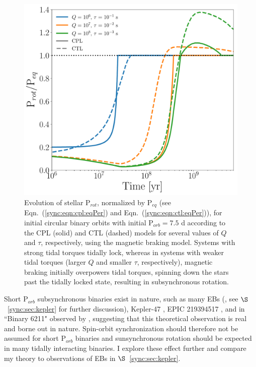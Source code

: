 \begin{figure}
	\includegraphics[width=\columnwidth]{eqPerShortPorbMatt.pdf}
   \caption{Evolution of stellar P$_{rot}$, normalized by P$_{eq}$ (see Eqn.~(\ref{sync:eqn:cpl:eqPer}) and Eqn.~(\ref{sync:eqn:ctl:eqPer})), for initial circular binary orbits with initial P$_{orb} = 7.5$ d according to the CPL (solid) and CTL (dashed) models for several values of $Q$ and $\tau$, respectively, using the \citet{Matt2015} magnetic braking model. Systems with strong tidal torques tidally lock, whereas in systems with weaker tidal torques (larger $Q$ and smaller $\tau$, respectively), magnetic braking initially overpowers tidal torques, spinning down the stars past the tidally locked state, resulting in subsynchronous rotation. }%
    \label{sync:fig:eqPerShortPorb}%
\end{figure}


Short P$_{orb}$ subsynchronous binaries exist in nature, such as many \kepler EBs (\citet{Lurie2017}, see $\S$~\ref{sync:sec:kepler} for further discussion), Kepler-47 \citep{Orosz2012}, EPIC 219394517 \citep{Torres2018}, and in ``Binary 6211" observed by \citet{Meibom2006}, suggesting that this theoretical observation is real and borne out in nature. Spin-orbit synchronization should therefore not be assumed for short P$_{orb}$ binaries and sunsynchronous rotation should be expected in many tidally interacting binaries.  I explore these effect further and compare my theory to observations of \kepler EBs in $\S$~\ref{sync:sec:kepler}.

